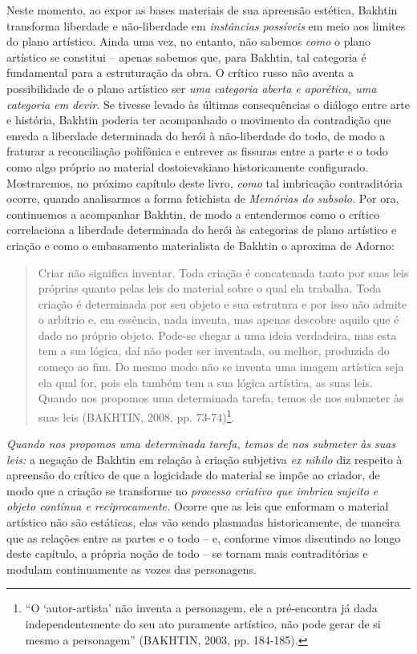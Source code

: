 Neste momento, ao expor as bases materiais de sua apreensão estética,
Bakhtin transforma liberdade e não-liberdade em \emph{instâncias
possíveis} em meio aos limites do plano artístico. Ainda uma vez, no
entanto, não sabemos \emph{como} o plano artístico se constitui --
apenas sabemos que, para Bakhtin, tal categoria é fundamental para a
estruturação da obra. O crítico russo não aventa a possibilidade de o
plano artístico ser \emph{uma categoria aberta e aporética, uma
categoria em devir}. Se tivesse levado às últimas consequências o
diálogo entre arte e história, Bakhtin poderia ter acompanhado o
movimento da contradição que enreda a liberdade determinada do herói à
não-liberdade do todo, de modo a fraturar a reconciliação polifônica e
entrever as fissuras entre a parte e o todo como algo próprio ao
material dostoievskiano historicamente configurado. Mostraremos, no
próximo capítulo deste livro, \emph{como} tal imbricação contraditória
ocorre, quando analisarmos a forma fetichista de \emph{Memórias do
subsolo.} Por ora, continuemos a acompanhar Bakhtin, de modo a
entendermos como o crítico correlaciona a liberdade determinada do herói
às categorias de plano artístico e criação e como o embasamento
materialista de Bakhtin o aproxima de Adorno:

\begin{quote}
Criar não significa inventar. Toda criação é concatenada tanto por suas
leis próprias quanto pelas leis do material sobre o qual ela trabalha.
Toda criação é determinada por seu objeto e sua estrutura e por isso não
admite o arbítrio e, em essência, nada inventa, mas apenas descobre
aquilo que é dado no próprio objeto. Pode-se chegar a uma ideia
verdadeira, mas esta tem a sua lógica, daí não poder ser inventada, ou
melhor, produzida do começo ao fim. Do mesmo modo não se inventa uma
imagem artística seja ela qual for, pois ela também tem a sua lógica
artística, as suas leis. Quando nos propomos uma determinada tarefa,
temos de nos submeter às suas leis (BAKHTIN, 2008, pp. 73-74)\footnote{``O
  `autor-artista' não inventa a personagem, ele a pré-encontra já dada
  independentemente do seu ato puramente artístico, não pode gerar de si
  mesmo a personagem'' (BAKHTIN, 2003, pp. 184-185).}.
\end{quote}

\emph{Quando nos propomos uma determinada tarefa, temos de nos submeter
às suas leis:} a negação de Bakhtin em relação à criação subjetiva
\emph{ex nihilo} diz respeito à apreensão do crítico de que a logicidade
do material se impõe ao criador, de modo que a criação se transforme no
\emph{processo criativo que imbrica sujeito e objeto contínua e
reciprocamente.} Ocorre que as leis que enformam o material artístico
não são estáticas, elas vão sendo plasmadas historicamente, de maneira
que as relações entre as partes e o todo -- e, conforme vimos discutindo
ao longo deste capítulo, a própria noção de todo -- se tornam mais
contraditórias e modulam continuamente as vozes das personagens.

